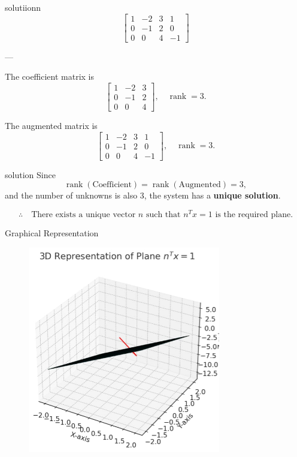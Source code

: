 \documentclass{beamer}
\begin{document}
\begin{frame}{solutiionn}
\[
\left[
\begin{array}{ccc|c}
1 & -2 & 3 & 1 \\
0 & -1 & 2 & 0 \\
0 & 0 & 4 & -1
\end{array}
\right]
\]

---

The coefficient matrix is
\[
\begin{bmatrix}
1 & -2 & 3 \\
0 & -1 & 2 \\
0 & 0 & 4
\end{bmatrix}, 
\quad \operatorname{rank} = 3.
\]

The augmented matrix is
\[
\begin{bmatrix}
1 & -2 & 3 & 1 \\
0 & -1 & 2 & 0 \\
0 & 0 & 4 & -1
\end{bmatrix}, 
\quad \operatorname{rank} = 3.
\]
\end{frame}
\begin{frame}{solution}
Since
\[
\operatorname{rank}(\text{Coefficient}) 
= \operatorname{rank}(\text{Augmented}) = 3,
\]
and the number of unknowns is also \(3\), the system has a \textbf{unique solution}.  

\[
\therefore \quad \text{There exists a unique vector } n 
\text{ such that } n^T x = 1 \text{ is the required plane.}
\]
\end{frame}
    \begin{frame}{Graphical Representation}
   \begin{figure}[h!]
\centering
\includegraphics[width=0.6\linewidth]{fig4.4.32.png}
\end{figure}
\end{frame}
\end{document}
